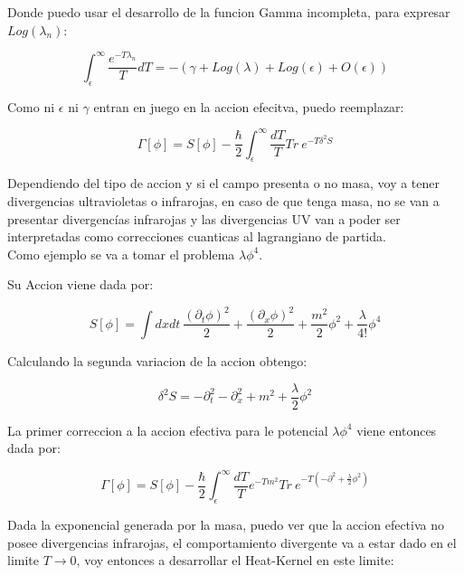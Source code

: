 Donde puedo usar el desarrollo de la funcion Gamma incompleta, para expresar $Log ( \lambda _n )$:

\begin{equation}
\int _ { \epsilon } ^{\infty} \frac{e ^{- T \lambda _n}}{T} dT =
- \left(
		\gamma + Log ( \lambda  ) + Log ( \epsilon  ) + O ( \epsilon  ) 
		\right)
\end{equation}

Como ni $ \epsilon $ ni $ \gamma $ entran en juego en la accion efecitva, puedo reemplazar:

\begin{equation}
\Gamma [ \phi ] = 
S[ \phi ] - 
\frac{\hbar }{2}
\int _ { \epsilon } ^{\infty} \frac{ dT}{T} Tr \  e ^{- T \delta ^2 S}
\end{equation}

Dependiendo del tipo de accion y si el campo presenta o no masa, voy a tener divergencias ultravioletas o infrarojas, en caso de que tenga masa, no se van a presentar divergencías infrarojas y las divergencias UV van a poder ser interpretadas como correcciones cuanticas al lagrangiano de partida. \\


Como ejemplo se va a tomar el problema $\lambda \phi ^4 $.

Su Accion viene dada por:

\begin{equation}
S[ \phi ] = \int dx dt \ 
\frac{( \partial _t \phi ) ^2}{2} +  
\frac{( \partial _x \phi ) ^2}{2} +
\frac{m ^2 }{2} \phi ^2 +
\frac{\lambda}{4!} \phi ^4 
\end{equation}

Calculando la segunda variacion de la accion obtengo:

\begin{equation}
\delta ^2 S = 
- \partial _t ^2 
- \partial _x ^2 
+ m ^2 
+ \frac{\lambda}{2}\phi ^2 
\end{equation}

La primer correccion a la accion efectiva para le potencial $\lambda \phi ^4 $ viene entonces dada por:

\begin{equation}
\Gamma [ \phi ] = 
S[ \phi ] - 
\frac{\hbar }{2}
\int _ { \epsilon } ^{\infty} \frac{ dT}{T} 
e ^{- T m ^2 }
Tr \  e ^{- T ( - \partial ^2 + \frac{\lambda}{2} \phi ^2 ) }
\end{equation}

Dada la exponencial generada por la masa, puedo ver que la accion efectiva no posee divergencias infrarojas, el comportamiento divergente va a estar dado en el limite $T \rightarrow 0$, voy entonces a desarrollar el Heat-Kernel en este limite:



